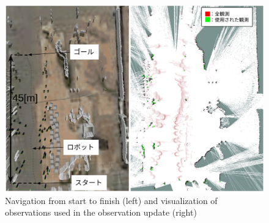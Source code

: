 \documentclass{jarticle}
\begin{document}



\begin{figure}[t]
  \centering
   \includegraphics[width=0.8\linewidth]{fig/particle_1000_observation_1_mcl.png}
   \caption{Navigation from start to finish (left) and visualization of observations used in the observation update (right)}
   \label{fig:スタートからゴールまでナビゲーション}
\end{figure}
\end{document}
